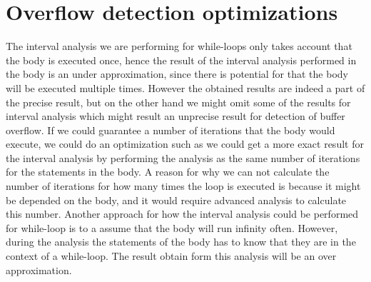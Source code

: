 \section{Overflow detection optimizations}
The interval analysis we are performing for while-loops only takes account that the body is executed once, hence the result of the interval analysis performed in the body is an under approximation, since there is potential for that the body will be executed multiple times. However the obtained results are indeed a part of the precise result, but on the other hand we might omit some of the results for interval analysis which might result an unprecise result for detection of buffer overflow.
If we could guarantee a number of iterations that the body would execute, we could do an optimization such as we could get a more exact result for the interval analysis by performing the analysis as the same number of iterations for the statements in the body.   
A reason for why we can not calculate the number of iterations for how many times the loop is executed is because it might be depended on the body, and it would require advanced analysis to calculate this number.
Another approach for how the interval analysis could be performed for while-loop is to a assume that the body will run infinity often. However, during the analysis the statements of the body has to know that they are in the context of a while-loop. The result obtain form this analysis will be an over approximation.




